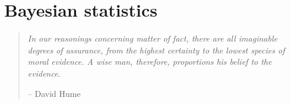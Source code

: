 
\chapter{Bayesian statistics \label{ch:bayes}}

\begin{quote}
{\it In our reasonings concerning matter of fact, there are all imaginable degrees of assurance, from the highest certainty to the lowest species of moral evidence. A wise man, therefore, proportions his belief to the evidence.} 

\hspace*{2cm} -- David Hume
\end{quote}


%
%




